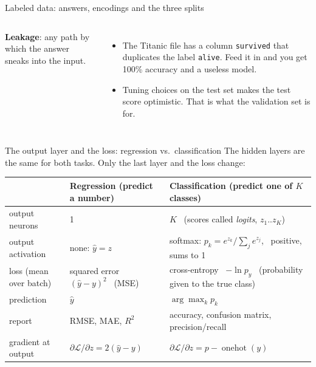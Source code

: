 \documentclass[aspectratio=169,10pt]{beamer}
\newcommand{\key}[1]{\textbf{\color{cAtt}#1}}
\begin{document}
\begin{frame}{Labeled data: answers, encodings and the three splits}
\begin{columns}[T,onlytextwidth]
\vspace{1.5mm}
\key{Leakage}: any path by which the answer sneaks into the input.
\begin{itemize}\footnotesize
  \item The Titanic file has a column \texttt{survived} that duplicates the label \texttt{alive}.
        Feed it in and you get 100\% accuracy and a useless model.
  \item Tuning choices on the test set makes the test score optimistic. That is what the
        validation set is for.
\end{itemize}
\end{columns}
\end{frame}

\begin{frame}{The output layer and the loss: regression vs.\ classification}
\small
The hidden layers are the same for both tasks. Only the last layer and the loss change:

\vspace{1mm}
{\footnotesize
\renewcommand{\arraystretch}{1.3}
\begin{tabular}{@{}p{26mm}p{66mm}p{70mm}@{}}
\toprule
 & \textbf{Regression} (predict a number) & \textbf{Classification} (predict one of $K$ classes)\\
\midrule
output neurons & 1 & $K$ \ (scores called \emph{logits}, $z_1..z_K$)\\
output activation & none: $\hat y=z$ & softmax: $p_k=e^{z_k}/\sum_j e^{z_j}$, \ positive, sums to 1\\
loss (mean over batch) & squared error \ $(\hat y-y)^2$ \ (MSE) & cross-entropy \ $-\ln p_{y}$ \ (probability given to the true class)\\
prediction & $\hat y$ & $\arg\max_k p_k$\\
report & RMSE, MAE, $R^2$ & accuracy, confusion matrix, precision/recall\\
gradient at output & $\partial\mathcal L/\partial z=2(\hat y-y)$ & $\partial\mathcal L/\partial z=p-\operatorname{onehot}(y)$\\
\bottomrule
\end{tabular}}


\end{frame}
\end{document}
